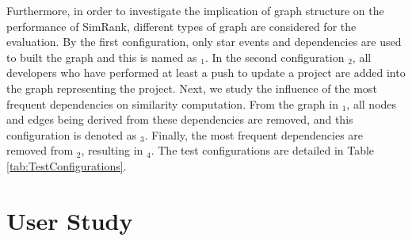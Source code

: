 Furthermore, in order to investigate the implication of graph structure on the performance of SimRank, different types of graph are considered for the evaluation. By the first configuration, only star events and dependencies are used to built the graph and this is named as \CrossSimA$_{1}$. In the second configuration \CrossSimA$_{2}$, all developers who have performed at least a push to update a project are added into the graph representing the project. Next, we study the influence of the most frequent dependencies on similarity computation. From the graph in \CrossSimA$_{1}$, all nodes and edges being derived from these dependencies are removed, and this configuration is denoted as \CrossSimA$_{3}$. Finally, the most frequent dependencies are removed from \CrossSimA$_{2}$, resulting in \CrossSimA$_{4}$. The test configurations are detailed in Table \ref{tab:TestConfigurations}.




\section{User Study} \label{sec:UserStudy}



